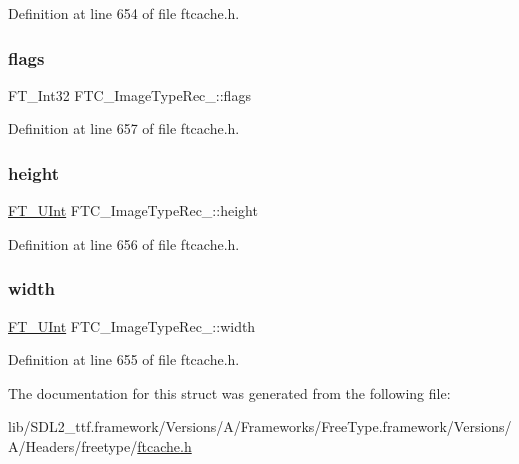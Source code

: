 Definition at line 654 of file ftcache.\+h.

\mbox{\label{struct_f_t_c___image_type_rec___a391782ed8c67de86591c71f276ea6454}} 
\subsubsection{\texorpdfstring{flags}{flags}}
{\footnotesize\ttfamily F\+T\+\_\+\+Int32 F\+T\+C\+\_\+\+Image\+Type\+Rec\+\_\+\+::flags}



Definition at line 657 of file ftcache.\+h.

\mbox{\label{struct_f_t_c___image_type_rec___a29ac83aa58a7d9d669d27ddcbb970f95}} 
\subsubsection{\texorpdfstring{height}{height}}
{\footnotesize\ttfamily \mbox{\hyperlink{fttypes_8h_abcb8db4dbf35d2b55a9e8c7b0926dc52}{F\+T\+\_\+\+U\+Int}} F\+T\+C\+\_\+\+Image\+Type\+Rec\+\_\+\+::height}



Definition at line 656 of file ftcache.\+h.

\mbox{\label{struct_f_t_c___image_type_rec___abd2bc251e7dbded1932e25841a41ab71}} 
\subsubsection{\texorpdfstring{width}{width}}
{\footnotesize\ttfamily \mbox{\hyperlink{fttypes_8h_abcb8db4dbf35d2b55a9e8c7b0926dc52}{F\+T\+\_\+\+U\+Int}} F\+T\+C\+\_\+\+Image\+Type\+Rec\+\_\+\+::width}



Definition at line 655 of file ftcache.\+h.



The documentation for this struct was generated from the following file\+:\begin{DoxyCompactItemize}
\item 
lib/\+S\+D\+L2\+\_\+ttf.\+framework/\+Versions/\+A/\+Frameworks/\+Free\+Type.\+framework/\+Versions/\+A/\+Headers/freetype/\mbox{\hyperlink{ftcache_8h}{ftcache.\+h}}\end{DoxyCompactItemize}

